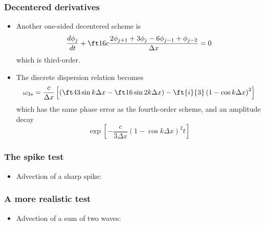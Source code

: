 \documentclass[aspectratio=149,9pt]{beamer}
\begin{document}
\begin{frame}
	\frametitle{Decentered derivatives}
	\vfill\begin{itemize}
		\item Another one-sided decentered scheme is 
			\begin{equation*}
				\frac{d \phi_j}{dt} + \ft16 c \frac{2 \phi_{j+1} + 3 \phi_j - 6 \phi_{j-1} + \phi_{j-2}}{\Delta x} = 0
			\end{equation*}
			which is third-order.\vfill
		\item The discrete dispersion relation becomes
			\begin{equation*}
				\omega_{3s} = \frac{c}{\Delta x} \left[ \left( \ft43 \sin k \Delta x - \ft16 \sin 2 k \Delta x \right)
					- \ft{i}{3} \left( 1 - \cos k \Delta x	\right)^2 \right]
			\end{equation*}
			which has the same phase error as the fourth-order scheme, and an amplitude decay
			\begin{equation*}
				\exp \left[ - \frac{c}{3\Delta x} \left( 1 - \cos k \Delta x \right)^2 t \right]
			\end{equation*}
	\end{itemize}\vfill
\end{frame}
%
%
\begin{frame}
	\frametitle{The spike test}
	\vfill\begin{itemize}
		\item Advection of a sharp spike:
			\begin{center}
				\scalebox{.8}{}
			\end{center}
	\end{itemize}\vfill
\end{frame}
%
%
\begin{frame}
	\frametitle{A more realistic test}
	\vfill\begin{itemize}
		\item Advection of a sum of two waves:
			\begin{center}
				\scalebox{.8}{}
			\end{center}
	\end{itemize}\vfill
\end{frame}
%
%
\end{document}
